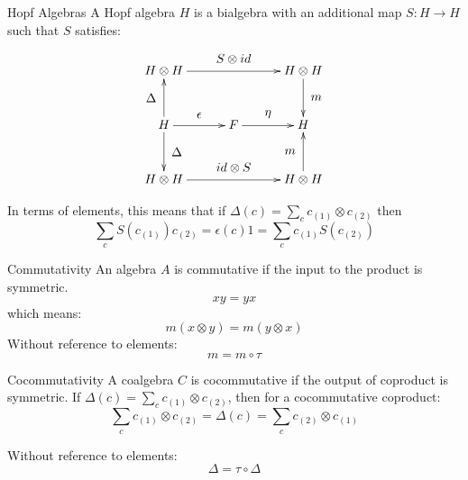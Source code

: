 \documentclass[pdf,colorBG,slideColor,fyma]{prosper}
\begin{document}
\begin{slide}{Hopf Algebras}
A Hopf algebra $H$ is a bialgebra with an additional map $S: H \rightarrow H$
such that $S$ satisfies:
\[
\xymatrix@=30pt{
H \otimes H \ar[rr]^-*+{S \otimes id}                        &                    & H \otimes H \ar[d]^-*+{m}\\
H \ar[u]^-*+{\Delta} \ar[d]^-*+{\Delta} \ar[r]^-*+{\epsilon} & F \ar[r]^-*+{\eta} & H \\
H \otimes H \ar[rr]^-*+{id \otimes S}                        &                    & H \otimes H \ar[u]^-*+{m}\\
}
\]

In terms of elements, this means that if $\Delta(c) = \sum_c c_{(1)} \otimes c_{(2)}$ then
\[
\sum_c S(c_{(1)})c_{(2)} = \epsilon(c) 1 = \sum_c c_{(1)}S(c_{(2)})
\]


\end{slide}

\begin{slide}{Commutativity}
An algebra $A$ is commutative if the input to the product is symmetric.
\[
xy = yx
\]
which means:
\[
m(x \otimes y) = m(y \otimes x)
\]
Without reference to elements:
\[
m  = m \circ \tau
\]
\end{slide}

\begin{slide}{Cocommutativity}
A coalgebra $C$ is cocommutative if the output of coproduct is symmetric.
\break
\break
If $\Delta(c) = \sum_c c_{(1)} \otimes c_{(2)}$, then for a cocommutative coproduct:
\[
\sum_c c_{(1)} \otimes c_{(2)} = \Delta(c) = \sum_c c_{(2)} \otimes c_{(1)}
\]

Without reference to elements:
\[
\Delta  = \tau \circ \Delta
\]
\end{slide}
\end{document}
